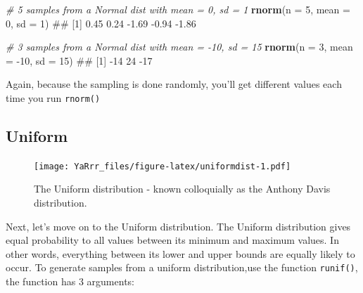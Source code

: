 \documentclass[]{book}
\newenvironment{Shaded}{\begin{snugshade}}{\end{snugshade}}
\newcommand{\KeywordTok}[1]{\textcolor[rgb]{0.13,0.29,0.53}{\textbf{{#1}}}}
\newcommand{\DataTypeTok}[1]{\textcolor[rgb]{0.13,0.29,0.53}{{#1}}}
\newcommand{\DecValTok}[1]{\textcolor[rgb]{0.00,0.00,0.81}{{#1}}}
\newcommand{\CommentTok}[1]{\textcolor[rgb]{0.56,0.35,0.01}{\textit{{#1}}}}
\newcommand{\NormalTok}[1]{{#1}}
\theoremstyle{definition}
\theoremstyle{definition}
\theoremstyle{remark}
\begin{document}
\begin{Shaded}
\begin{Highlighting}[]
\CommentTok{# 5 samples from a Normal dist with mean = 0, sd = 1}
\KeywordTok{rnorm}\NormalTok{(}\DataTypeTok{n =} \DecValTok{5}\NormalTok{, }\DataTypeTok{mean =} \DecValTok{0}\NormalTok{, }\DataTypeTok{sd =} \DecValTok{1}\NormalTok{)}
\NormalTok{## [1]  0.45  0.24 -1.69 -0.94 -1.86}

\CommentTok{# 3 samples from a Normal dist with mean = -10, sd = 15}
\KeywordTok{rnorm}\NormalTok{(}\DataTypeTok{n =} \DecValTok{3}\NormalTok{, }\DataTypeTok{mean =} \NormalTok{-}\DecValTok{10}\NormalTok{, }\DataTypeTok{sd =} \DecValTok{15}\NormalTok{)}
\NormalTok{## [1] -14  24 -17}
\end{Highlighting}
\end{Shaded}

Again, because the sampling is done randomly, you'll get different
values each time you run \texttt{rnorm()}

\subsection{Uniform}\label{uniform}

\begin{figure}[htbp]
\centering
\texttt{[image: YaRrr\_files/figure-latex/uniformdist-1.pdf]}
\caption{\label{fig:uniformdist}The Uniform distribution - known
colloquially as the Anthony Davis distribution.}
\end{figure}

Next, let's move on to the Uniform distribution. The Uniform
distribution gives equal probability to all values between its minimum
and maximum values. In other words, everything between its lower and
upper bounds are equally likely to occur. To generate samples from a
uniform distribution,use the function \texttt{runif()}, the function has
3 arguments:
\end{document}
